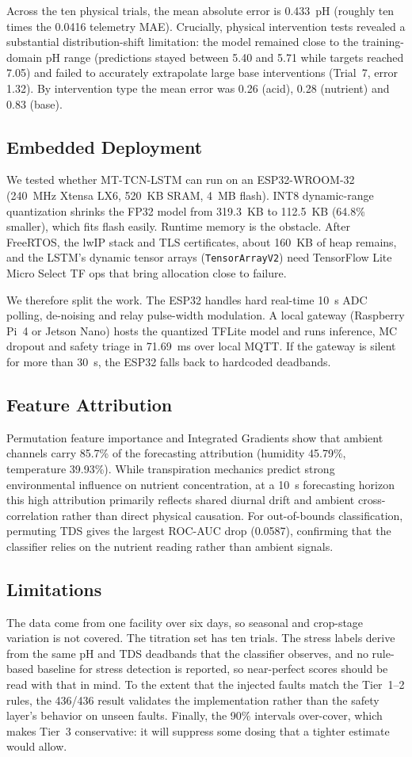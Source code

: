 Across the ten physical trials, the mean absolute error is 0.433~pH (roughly ten times the 0.0416 telemetry MAE). Crucially, physical intervention tests revealed a substantial distribution-shift limitation: the model remained close to the training-domain pH range (predictions stayed between 5.40 and 5.71 while targets reached 7.05) and failed to accurately extrapolate large base interventions (Trial~7, error 1.32). By intervention type the mean error was 0.26 (acid), 0.28 (nutrient) and 0.83 (base).

\subsection{Embedded Deployment}
We tested whether MT-TCN-LSTM can run on an ESP32-WROOM-32 (240~MHz Xtensa LX6, 520~KB SRAM, 4~MB flash). INT8 dynamic-range quantization shrinks the FP32 model from 319.3~KB to 112.5~KB (64.8\% smaller), which fits flash easily. Runtime memory is the obstacle. After FreeRTOS, the lwIP stack and TLS certificates, about 160~KB of heap remains, and the LSTM's dynamic tensor arrays (\texttt{TensorArrayV2}) need TensorFlow Lite Micro Select TF ops that bring allocation close to failure.

We therefore split the work. The ESP32 handles hard real-time 10~s ADC polling, de-noising and relay pulse-width modulation. A local gateway (Raspberry Pi~4 or Jetson Nano) hosts the quantized TFLite model and runs inference, MC dropout and safety triage in 71.69~ms over local MQTT. If the gateway is silent for more than 30~s, the ESP32 falls back to hardcoded deadbands.

\subsection{Feature Attribution}
Permutation feature importance and Integrated Gradients \cite{sundararajan2017} show that ambient channels carry 85.7\% of the forecasting attribution (humidity 45.79\%, temperature 39.93\%). While transpiration mechanics predict strong environmental influence on nutrient concentration, at a 10~s forecasting horizon this high attribution primarily reflects shared diurnal drift and ambient cross-correlation rather than direct physical causation. For out-of-bounds classification, permuting TDS gives the largest ROC-AUC drop (0.0587), confirming that the classifier relies on the nutrient reading rather than ambient signals.

\subsection{Limitations}
The data come from one facility over six days, so seasonal and crop-stage variation is not covered. The titration set has ten trials. The stress labels derive from the same pH and TDS deadbands that the classifier observes, and no rule-based baseline for stress detection is reported, so near-perfect scores should be read with that in mind. To the extent that the injected faults match the Tier~1--2 rules, the 436/436 result validates the implementation rather than the safety layer's behavior on unseen faults. Finally, the 90\% intervals over-cover, which makes Tier~3 conservative: it will suppress some dosing that a tighter estimate would allow.
